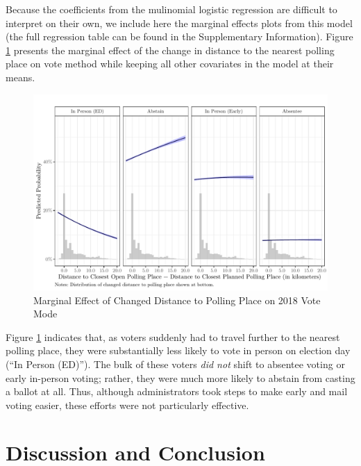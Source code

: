\documentclass[
  12pt,
]{article}
\begin{document}
Because the coefficients from the mulinomial logistic regression are difficult to interpret on their own, we include here the marginal effects plots from this model (the full regression table can be found in the Supplementary Information). Figure \ref{fig:marg-multi} presents the marginal effect of the change in distance to the nearest polling place on vote method while keeping all other covariates in the model at their means.

\begin{figure}[h]

{\centering \includegraphics{hurricane_michael_files/figure-latex/marg-multi-1} 

}

\caption{\label{fig:marg-multi}Marginal Effect of Changed Distance to Polling Place on 2018 Vote Mode}\label{fig:marg-multi}
\end{figure}

Figure \ref{fig:marg-multi} indicates that, as voters suddenly had to travel further to the nearest polling place, they were substantially less likely to vote in person on election day (``In Person (ED)''). The bulk of these voters \emph{did not} shift to absentee voting or early in-person voting; rather, they were much more likely to abstain from casting a ballot at all. Thus, although administrators took steps to make early and mail voting easier, these efforts were not particularly effective.

\hypertarget{discussion-and-conclusion}{%
\section*{Discussion and Conclusion}\label{discussion-and-conclusion}}
\end{document}
